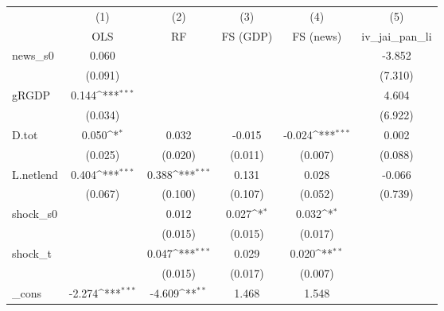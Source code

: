 {
\def\sym#1{\ifmmode^{#1}\else\(^{#1}\)\fi}
\begin{tabular}{l*{5}{c}}
\toprule
            &\multicolumn{1}{c}{(1)}&\multicolumn{1}{c}{(2)}&\multicolumn{1}{c}{(3)}&\multicolumn{1}{c}{(4)}&\multicolumn{1}{c}{(5)}\\
            &\multicolumn{1}{c}{OLS}&\multicolumn{1}{c}{RF}&\multicolumn{1}{c}{FS (GDP)}&\multicolumn{1}{c}{FS (news)}&\multicolumn{1}{c}{iv\_jai\_pan\_li}\\
\midrule
news\_s0     &       0.060         &                     &                     &                     &      -3.852         \\
            &     (0.091)         &                     &                     &                     &     (7.310)         \\
\addlinespace
gRGDP       &       0.144\sym{***}&                     &                     &                     &       4.604         \\
            &     (0.034)         &                     &                     &                     &     (6.922)         \\
\addlinespace
D.tot       &       0.050\sym{*}  &       0.032         &      -0.015         &      -0.024\sym{***}&       0.002         \\
            &     (0.025)         &     (0.020)         &     (0.011)         &     (0.007)         &     (0.088)         \\
\addlinespace
L.netlend   &       0.404\sym{***}&       0.388\sym{***}&       0.131         &       0.028         &      -0.066         \\
            &     (0.067)         &     (0.100)         &     (0.107)         &     (0.052)         &     (0.739)         \\
\addlinespace
shock\_s0    &                     &       0.012         &       0.027\sym{*}  &       0.032\sym{*}  &                     \\
            &                     &     (0.015)         &     (0.015)         &     (0.017)         &                     \\
\addlinespace
shock\_t     &                     &       0.047\sym{***}&       0.029         &       0.020\sym{**} &                     \\
            &                     &     (0.015)         &     (0.017)         &     (0.007)         &                     \\
\addlinespace
\_cons      &      -2.274\sym{***}&      -4.609\sym{**} &       1.468         &       1.548         &                     \\

\end{tabular}}
